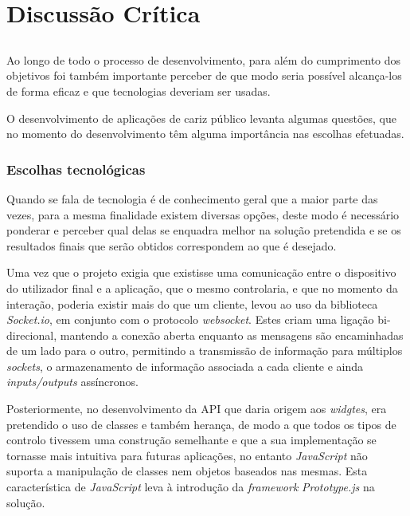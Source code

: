 \chapter{Discussão Crítica} \label{chap:disc}

\section*{}

Ao longo de todo o processo de desenvolvimento, para além do cumprimento dos objetivos foi também importante perceber de que modo seria possível alcança-los de forma eficaz e que tecnologias deveriam ser usadas.

O desenvolvimento de aplicações de cariz público levanta algumas questões, que no momento do desenvolvimento têm alguma importância nas escolhas efetuadas.

\subsection*{Escolhas tecnológicas}

Quando se fala de tecnologia é de conhecimento geral que a maior parte das vezes, para a mesma finalidade existem diversas opções, deste modo é necessário ponderar e perceber qual delas se enquadra melhor na solução pretendida e se os resultados finais que serão obtidos correspondem ao que é desejado.

Uma vez que o projeto exigia que existisse uma comunicação entre o dispositivo do utilizador final e a aplicação, que o mesmo controlaria, e que no momento da interação, poderia existir mais do que um cliente, levou ao uso da biblioteca \textit{Socket.io}, em conjunto com o protocolo \textit{websocket}. Estes criam uma ligação bi-direcional, mantendo a conexão aberta enquanto as mensagens são encaminhadas de um lado para o outro, permitindo a transmissão de informação para múltiplos \textit{sockets}, o armazenamento de informação associada a cada cliente e ainda \textit{inputs/outputs} assíncronos. 

Posteriormente, no desenvolvimento da API que daria origem aos \textit{widgtes}, era pretendido o uso de classes e também herança, de modo a que todos os tipos de controlo tivessem uma construção semelhante e que a sua implementação se tornasse mais intuitiva para futuras aplicações, no entanto \textit{JavaScript} não suporta a manipulação de classes nem objetos baseados nas mesmas. Esta característica de \textit{JavaScript} leva à introdução da \textit{framework} \textit{Prototype.js} na solução.

